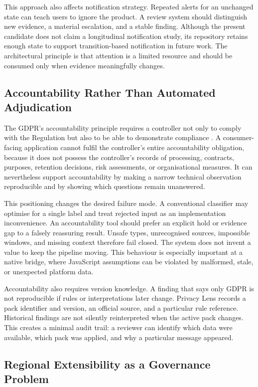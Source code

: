 This approach also affects notification strategy. Repeated alerts for an unchanged state can teach users to ignore the product. A review system should distinguish new evidence, a material escalation, and a stable finding. Although the present candidate does not claim a longitudinal notification study, its repository retains enough state to support transition-based notification in future work. The architectural principle is that attention is a limited resource and should be consumed only when evidence meaningfully changes.

\subsection{Accountability Rather Than Automated Adjudication}

The GDPR's accountability principle requires a controller not only to comply with the Regulation but also to be able to demonstrate compliance \cite{eurlex2016}. A consumer-facing application cannot fulfil the controller's entire accountability obligation, because it does not possess the controller's records of processing, contracts, purposes, retention decisions, risk assessments, or organisational measures. It can nevertheless support accountability by making a narrow technical observation reproducible and by showing which questions remain unanswered.

This positioning changes the desired failure mode. A conventional classifier may optimise for a single label and treat rejected input as an implementation inconvenience. An accountability tool should prefer an explicit hold or evidence gap to a falsely reassuring result. Unsafe types, unrecognised sources, impossible windows, and missing context therefore fail closed. The system does not invent a value to keep the pipeline moving. This behaviour is especially important at a native bridge, where JavaScript assumptions can be violated by malformed, stale, or unexpected platform data.

Accountability also requires version knowledge. A finding that says only GDPR is not reproducible if rules or interpretations later change. Privacy Lens records a pack identifier and version, an official source, and a particular rule reference. Historical findings are not silently reinterpreted when the active pack changes. This creates a minimal audit trail: a reviewer can identify which data were available, which pack was applied, and why a particular message appeared.

\subsection{Regional Extensibility as a Governance Problem}

